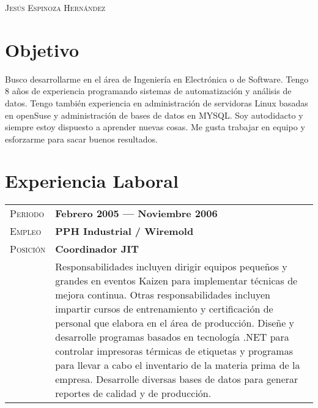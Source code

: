\documentclass[a4paper, oneside, final]{scrartcl} %
\newcommand{\gray}{\rowcolor[gray]{.90}} %
\begin{document}
\begin{center} %


{\fontsize{26}{26}\selectfont\scshape Jes\'us Espinoza Hern\'andez} %

\vspace{1.5cm} %


\section{Objetivo}

Busco desarrollarme en el área de Ingeniería en Electrónica o de Software. Tengo 8 años de experiencia programando sistemas de automatización y análisis de datos. Tengo también experiencia en administración de servidoras Linux basadas en openSuse y administración de bases de datos en MYSQL. Soy autodidacto y siempre estoy dispuesto a aprender nuevas cosas. Me gusta trabajar en equipo y esforzarme para sacar buenos resultados.


\section{Experiencia Laboral}

\begin{tabularx}{0.97\linewidth}{>{\raggedleft\scshape}p{2cm}X}
\gray Periodo & \textbf{Febrero 2005 --- Noviembre 2006}\\
\gray Empleo & \textbf{PPH Industrial / Wiremold} \\ %
\gray Posición & \textbf{Coordinador JIT}\\
& Responsabilidades incluyen dirigir equipos peque\~nos y grandes en eventos Kaizen para implementar técnicas de mejora continua. Otras responsabilidades incluyen impartir cursos de entrenamiento y certificación de personal que elabora en el área de producción. Diseñe y desarrolle programas basados en tecnología .NET para controlar impresoras térmicas de etiquetas y programas para llevar a cabo el inventario de la materia prima de la empresa. Desarrolle diversas bases de datos para generar reportes de calidad y de producción.
\end{tabularx}


\end{center}
\end{document}
